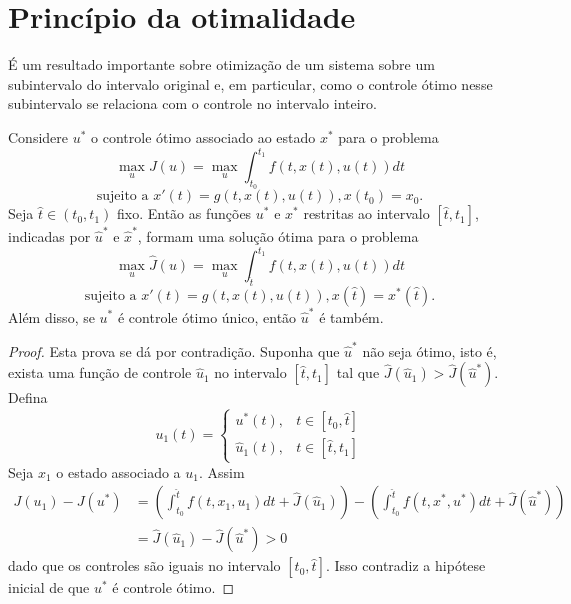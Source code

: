 \section{Princípio da otimalidade}

É um resultado importante sobre otimização de um sistema sobre um subintervalo do
intervalo original e, em particular, como o controle ótimo nesse subintervalo
se relaciona com o controle no intervalo inteiro. 

\begin{theorem}
    Considere $u^*$ o controle ótimo associado ao estado $x^*$ para o problema
    $$
    \max_u J(u) = \max_u \int_{t_0}^{t_1} f(t, x(t), u(t)) dt 
    $$
    $$
    \text{sujeito a  }x'(t) = g(t, x(t), u(t)), x(t_0) = x_0.
    $$
    Seja $\hat{t} \in (t_0, t_1)$ fixo. Então as
    funções $u^*$ e $x^*$ restritas ao intervalo $[\hat{t},t_1]$, indicadas
    por $\hat{u}^*$ e $\hat{x}^*$, formam uma solução ótima para o problema 
    $$
    \max_u \hat{J}(u) = \max_u \int_{\hat{t}}^{t_1} f(t, x(t), u(t)) dt 
    $$
    $$
    \text{sujeito a  }x'(t) = g(t, x(t), u(t)), x(\hat{t}) = x^*(\hat{t}).
    $$
    Além disso, se $u^*$ é controle ótimo único, então
    $\hat{u}^*$ é também. 
\end{theorem}

\begin{proof}
    Esta prova se dá por contradição. Suponha que $\hat{u}^*$ não seja ótimo,
    isto é, exista uma função de controle $\hat{u}_1$ no intervalo $[\hat{t},
    t_1]$ tal que $\hat{J}(\hat{u}_1) > \hat{J}(\hat{u}^*)$. Defina 
    $$u_1(t) = 
    \begin{cases}
        u^*(t), &t \in [t_0, \hat{t}] \\
        \hat{u}_1(t), &t \in [\hat{t}, t_1]
    \end{cases}
    $$
    Seja $x_1$ o estado associado a $u_1$. Assim 
    \begin{equation*}
        \begin{split}
            J(u_1) - J(u^*) &= \left(\int_{t_0}^{\hat{t}} f(t,x_1,u_1)dt +
            \hat{J}(\hat{u}_1)\right) - \left(\int_{t_0}^{\hat{t}} f(t,x^*,u^*)dt +
            \hat{J}(\hat{u}^*)\right) \\
            &= \hat{J}(\hat{u}_1) - \hat{J}(\hat{u}^*) > 0 
        \end{split}        
    \end{equation*}
    dado que os controles são iguais no intervalo $[t_0, \hat{t}]$. Isso contradiz a hipótese inicial de que $u^*$ é controle ótimo. 
\end{proof}

